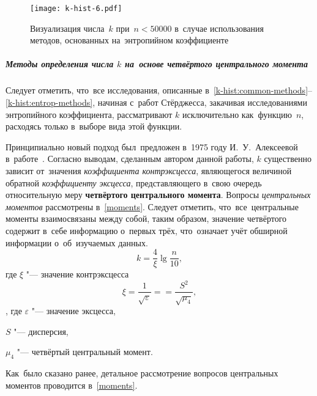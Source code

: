 \documentclass[]{scrartcl}
\begin{document}
\begin{figure}[ht]
	\centering %
	\texttt{[image: k-hist-6.pdf]}
	\caption{Визуализация числа~$k$ при~$n < 50000$ в~случае использования методов, основанных на~энтропийном коэффициенте}\label{fig:k-hist-n6}
\end{figure}

\subparagraph{Методы определения числа $k$ на~основе четвёртого центрального момента}
\par

Следует отметить, что~все исследования, описанные в~\ref*{k-hist:common-methods}--\ref{k-hist:entrop-methods}, начиная с~работ Стёрджесса, закачивая исследованиями энтропийного коэффициента, рассматривают $k$ исключительно как~функцию~$n$, расходясь только в~выборе вида этой функции.

Принципиально новый подход был~предложен в~1975 году И.~У.~Алексеевой в~работе~\cite{Alekseewa:k-hist}. Согласно выводам, сделанным автором данной работы, $k$ существенно зависит от~значения \emph{коэффициента контрэксцесса}, являющегося величиной обратной \emph{коэффициенту эксцесса}, представляющего в~свою очередь относительную меру \textbf{четвёртого центрального момента}. Вопросы \emph{центральных моментов} рассмотрены в~\ref{moments}. Следует отметить, что~все~центральные моменты взаимосвязаны между собой, таким образом, значение четвёртого содержит в~себе информацию о~первых трёх, что~означает учёт обширной информации о~об~изучаемых данных.
\begin{equation}\label{eq:hist_Alekseewa-0}
k = \frac{4}{\xi}\lg\frac{n}{10},
\end{equation}
где $\xi$ "--- значение контрэксцесса
\begin{equation}\label{eq:kontr-kurtosis}
\xi = \frac{1}{\sqrt{\varepsilon}} == \frac{S^2}{\sqrt{\mu_4}},
\end{equation},
где $\varepsilon$ "--- значение эксцесса,

$S$ "--- дисперсия,

$\mu_4$ "--- четвёртый центральный момент.

Как~было сказано ранее, детальное рассмотрение вопросов центральных моментов проводится в~\ref{moments}.
\end{document}
